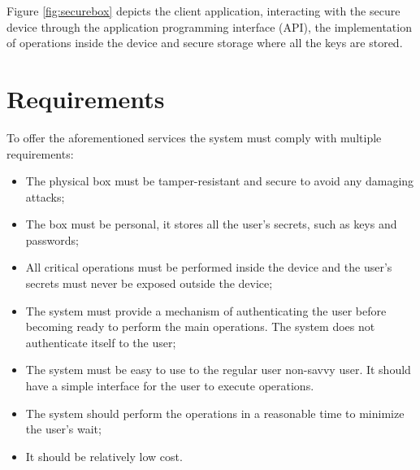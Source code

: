 Figure \ref{fig:securebox} depicts the client application, interacting with the secure device through the application programming interface (API), the implementation of operations inside the device and secure storage where all the keys are stored.

\section{Requirements} \label{chap:intro:requirements}

To offer the aforementioned services the system must comply with multiple requirements:
\begin{itemize}
    \item The physical box must be tamper-resistant and secure to avoid any damaging attacks;
    \item The box must be personal, it stores all the user's secrets, such as keys and passwords;
    \item All critical operations must be performed inside the device and the user's secrets must never be exposed outside the device;
    \item The system must provide a mechanism of authenticating the user before becoming ready to perform the main operations. The system does not authenticate itself to the user;
    \item The system must be easy to use to the regular user non-savvy user. It should have a simple interface for the user to execute operations.
    \item The system should perform the operations in a reasonable time to minimize the user's wait;
    \item It should be relatively low cost.
\end{itemize}
